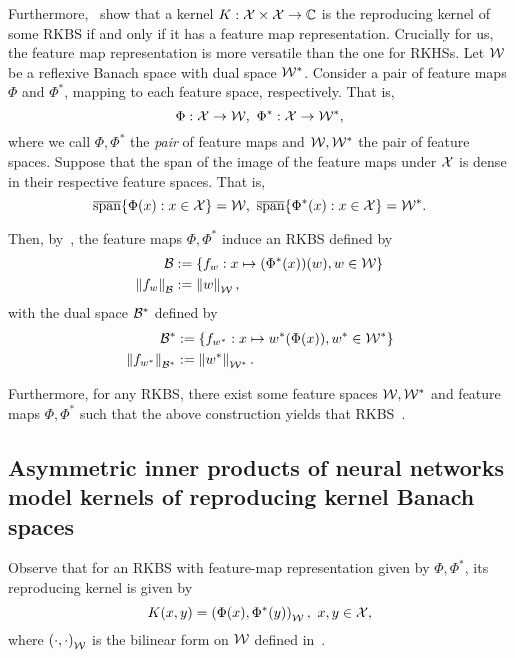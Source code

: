 Furthermore,~\parencite[Theorems 3 and 4]{zhangReproducingKernel2009} show that a kernel $K: {\mathcal{X}} \times {\mathcal{X}} \to {\mathbb{C}}$ is the reproducing kernel of some RKBS if and only if it has a feature map representation. Crucially for us, the feature map representation is more versatile than the one for RKHSs. Let ${\mathcal{W}}$ be a reflexive Banach space with dual space ${\mathcal{W}}^*$. Consider a pair of feature maps $\Phi$ and $\Phi^*$, mapping to each feature space, respectively. That is,
\begin{equation*}
    \Phi: \calX \to \calW, \ \Phi^*: \calX \to \calW^*,
\end{equation*}
where we call $\Phi, \Phi^*$ the \textit{pair} of feature maps and ${\mathcal{W}}, {\mathcal{W}}^*$ the pair of feature spaces. Suppose that the span of the image of the feature maps under ${\mathcal{X}}$ is dense in their respective feature spaces. That is,
\begin{equation}
    \overline{\text{span}}\{\Phi(x): x \in \calX\} = \calW, \ \overline{\text{span}}\{\Phi^*(x): x \in \calX\} = \calW^*.
\end{equation}

Then, by~\parencite[Theorem 3]{zhangReproducingKernel2009}, the feature maps $\Phi, \Phi^*$ induce an RKBS defined by
\begin{align}
    \calB &:= \set{f_w: x \mapsto (\Phi^*(x))(w), w \in \calW} \\
    \norm{f_w}_\calB &:= \norm{w}_\calW,
\end{align}
with the dual space ${\mathcal{B}}^*$ defined by
\begin{align}
    \calB^* &:= \set{f_{w^*}: x \mapsto w^*(\Phi(x)), w^* \in \calW^*} \\
    \norm{f_{w^*}}_{\calB^*} &:= \norm{w^*}_{\calW^*}.
\end{align}

Furthermore, for any RKBS, there exist some feature spaces ${\mathcal{W}}, {\mathcal{W}}^*$ and feature maps $\Phi, \Phi^*$ such that the above construction yields that RKBS~\parencite[Theorem 4]{zhangReproducingKernel2009}.

\subsection{Asymmetric inner products of neural networks model kernels of reproducing kernel Banach spaces}

Observe that for an RKBS with feature-map representation given by $\Phi, \Phi^*$, its reproducing kernel is given by
\begin{equation}
    K(x, y) = \paren{\Phi(x), \Phi^*(y)}_{\calW}, \ x, y \in \calX,
\end{equation}
where $\left(\cdot, \cdot\right)_{{\mathcal{W}}}$ is the bilinear form on ${\mathcal{W}}$ defined in~.


